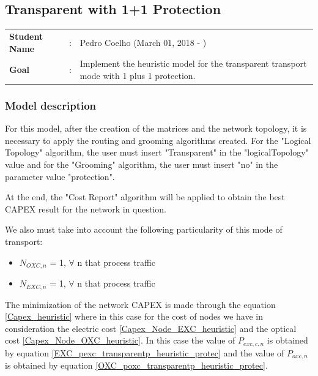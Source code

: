 \clearpage

\subsection{Transparent with 1+1 Protection}\label{heuristic_Transp_Protection}
\begin{tcolorbox}	
\begin{tabular}{p{2.75cm} p{0.2cm} p{10.5cm}} 	
\textbf{Student Name}  &:& Pedro Coelho    (March 01, 2018 - )\\
\textbf{Goal}          &:& Implement the heuristic model for the transparent transport mode with 1 plus 1 protection.
\end{tabular}
\end{tcolorbox}

\subsubsection{Model description}

\vspace{11pt}
For this model, after the creation of the matrices and the network topology, it is necessary to apply the routing and grooming algorithms created. For the "Logical Topology" algorithm, the user must insert "Transparent" in the "logicalTopology" value and for the "Grooming" algorithm, the user must insert "no" in the parameter value "protection".

At the end, the "Cost Report" algorithm will be applied to obtain the best CAPEX result for the network in question.

We also must take into account the following particularity of this mode of transport:
\begin{itemize}
  \item $N_{OXC,n}$ = 1, \quad $\forall$ n that process traffic
  \item $N_{EXC,n}$ = 1, \quad $\forall$ n that process traffic
\end{itemize}

\vspace{11pt}
The minimization of the network CAPEX is made through the equation \ref{Capex_heuristic} where in this case for the cost of nodes we have in consideration the electric cost \ref{Capex_Node_EXC_heuristic} and the optical cost \ref{Capex_Node_OXC_heuristic}.
In this case the value of $P_{exc,c,n}$ is obtained by equation \ref{EXC_pexc_transparentp_heuristic_protec} and the value of $P_{oxc,n}$ is obtained by equation \ref{OXC_poxc_transparentp_heuristic_protec}.\\


